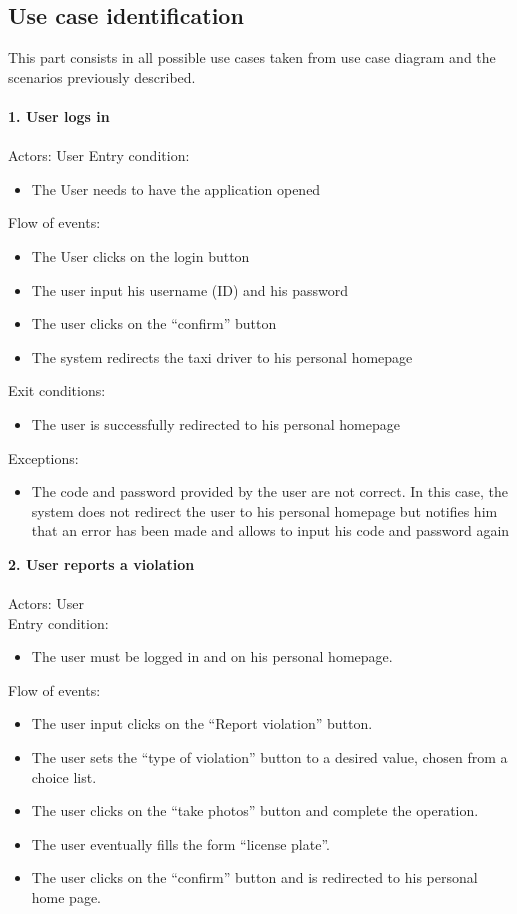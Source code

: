 \documentclass[a4paper]{report}
\begin{document}
\subsection{Use case identification}
This part consists in all possible use cases taken from use case diagram and the scenarios previously described.\\ \\
\textbf{1. User logs in}
\\
\\
Actors: User
Entry condition: 
\begin{itemize}
\item The User needs to have the application opened
\end{itemize}
Flow of events:
\begin{itemize}
\item The User clicks on the login button
\item The user input his username (ID) and his password
\item The user clicks on the “confirm” button
\item The system redirects the taxi driver to his personal homepage
\end{itemize}
Exit conditions: 
\begin{itemize}
\item The user is successfully redirected to his personal homepage
\end{itemize}
Exceptions: 
\begin{itemize}
\item The code and password provided by the user are not correct. In this case, the system does not redirect the user to his personal homepage but notifies him that an error has been made and allows to input his code and password again
\end{itemize}
\textbf{2. User reports a violation} \\ \\
Actors: User\\
Entry condition:
\begin{itemize}
 \item The user must be logged in and on his personal homepage.
 \end{itemize}
Flow of events:
 \begin{itemize}
\item The user input clicks on the “Report violation” button.
\item The user sets the “type of violation” button to a desired value, chosen from a choice list.
\item The user clicks on the “take photos” button and complete the operation.
\item The user eventually fills the form “license plate”.
\item The user clicks on the “confirm” button and is redirected to his personal home page.
\end{itemize}
\end{document}
